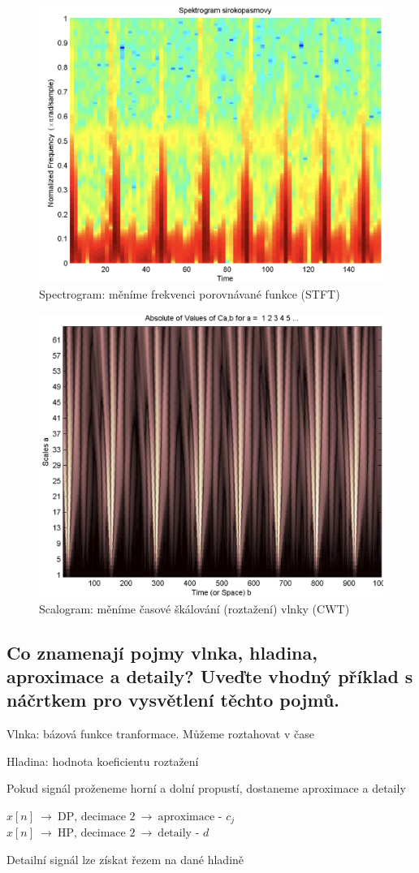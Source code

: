 \documentclass[a4paper,12pt]{article}   %
\begin{document}
\begin{figure}[h]
        \centering
        \includegraphics[width=.5\textwidth]{fig/spectrogram.png}
        \caption*{Spectrogram: měníme frekvenci porovnávané funkce (STFT)}
\end{figure}
\begin{figure}[h]
        \centering
        \includegraphics[width=.5\textwidth]{fig/scalogram.png}
        \caption*{Scalogram: měníme časové škálování (roztažení) vlnky (CWT)}
\end{figure}
\FloatBarrier

\subsection{Co znamenají pojmy vlnka, hladina, aproximace a detaily? Uveďte vhodný příklad s náčrtkem pro vysvětlení těchto pojmů.}
Vlnka: bázová funkce tranformace. Můžeme roztahovat v čase

Hladina: hodnota koeficientu roztažení

Pokud signál proženeme horní a dolní propustí, dostaneme aproximace a detaily

$x[n]~\rightarrow~\text{DP, decimace 2}~\rightarrow~\text{aproximace - }c_j$\\
$x[n]~\rightarrow~\text{HP, decimace 2}~\rightarrow~\text{detaily - }d$

Detailní signál lze získat řezem na dané hladině
\end{document}
